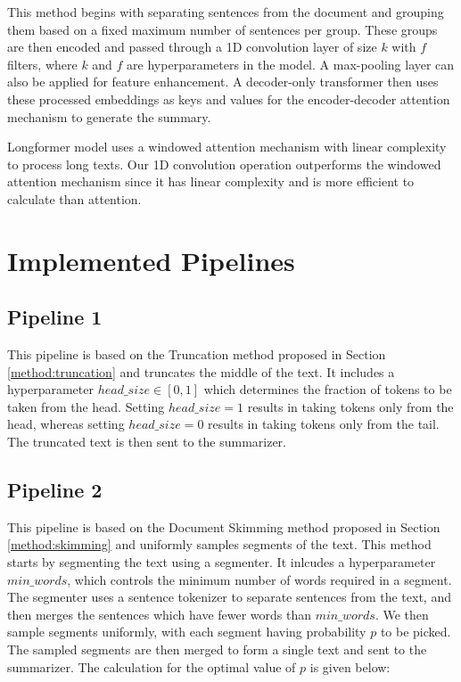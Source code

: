 This method begins with separating sentences from the document and grouping them
based on a fixed maximum number of sentences per group.
These groups are then encoded and passed through a 1D convolution layer of size $k$ with
$f$ filters, where $k$ and $f$ are hyperparameters in the model.
A max-pooling layer can also be applied for feature enhancement.
A decoder-only transformer then uses these processed embeddings as keys and values
for the encoder-decoder attention mechanism to generate the summary.

Longformer model \cite{beltagy2020longformer} uses a windowed attention mechanism with
linear complexity to process long texts.
Our 1D convolution operation outperforms the windowed attention mechanism since it has
linear complexity and is more efficient to calculate than attention.



\section{Implemented Pipelines}


\subsection*{Pipeline 1}

This pipeline is based on the Truncation method proposed in Section \ref{method:truncation}
and truncates the middle of the text.
It includes a hyperparameter $head\_size \in [0, 1]$ which determines the fraction of tokens
to be taken from the head.
Setting $head\_size = 1$ results in taking tokens only from the head, whereas
setting $head\_size = 0$ results in taking tokens only from the tail.
The truncated text is then sent to the summarizer.


\subsection*{Pipeline 2}

This pipeline is based on the Document Skimming method proposed in Section \ref{method:skimming}
and uniformly samples segments of the text.
This method starts by segmenting the text using a segmenter.
It inlcudes a hyperparameter $min\_words$, which controls the minimum number of words required
in a segment.
The segmenter uses a sentence tokenizer to separate sentences from the text, and then
merges the sentences which have fewer words than $min\_words$.
We then sample segments uniformly, with each segment having probability $p$ to be picked.
The sampled segments are then merged to form a single text and sent to the summarizer.
The calculation for the optimal value of $p$ is given below:

